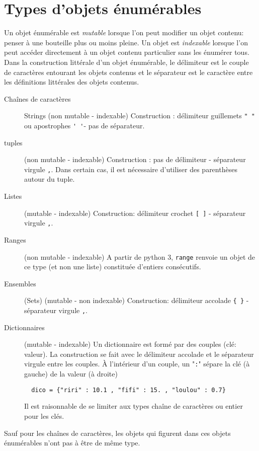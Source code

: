 \section{Types d'objets énumérables}
Un objet énumérable est \emph{mutable}  lorsque l'on peut modifier un objet contenu: penser à une bouteille plus ou moins pleine.\newline
Un objet est \emph{indexable}  lorsque l'on peut accéder directement à un objet contenu particulier sans les énumérer tous.\newline
Dans la construction littérale d'un objet énumérable, le délimiteur  est le couple de caractères entourant les objets contenus et le séparateur est le caractère entre les définitions littérales des objets contenus.
\begin{description}
 \item [Chaînes de caractères] Strings (non mutable - indexable) Construction : délimiteur guillemets \verb|" "| ou apostrophes \verb|' '|- pas de séparateur.
 \item [tuples] (non mutable - indexable) Construction : pas de délimiteur - séparateur virgule \verb|,|. Dans certain cas, il est nécessaire d'utiliser des parenthèses autour du tuple.
 \item [Listes] (mutable - indexable) Construction: délimiteur crochet \verb|[ ]| - séparateur virgule \verb|,|.
 \item [Ranges] (non mutable - indexable) A partir de python 3, \texttt{range} renvoie un objet de ce type (et non une liste) constituée d'entiers consécutifs.
 \item [Ensembles] (Sets) (mutable - non indexable) Construction: délimiteur accolade \verb|{ }| - séparateur virgule \verb|,|.
 \item [Dictionnaires] (mutable - indexable) Un dictionnaire est formé par des couples (clé: valeur). La construction se fait avec le délimiteur accolade et le séparateur virgule entre les couples. \`A l'intérieur d'un couple, un "\verb|:|" sépare la clé (à gauche) de la valeur (à droite)
 \begin{verbatim}
  dico = {"riri" : 10.1 , "fifi" : 15. , "loulou" : 0.7} \end{verbatim}
 Il est raisonnable de se limiter aux types chaîne de caractères ou entier pour les clés.
\end{description}
Sauf pour les chaînes de caractères, les objets qui figurent dans ces objets énumérables n'ont pas à être de même type.\newline
